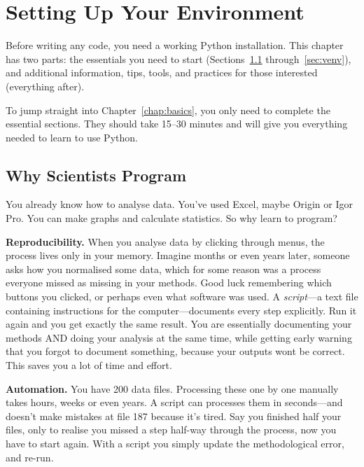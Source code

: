 
\chapter{Setting Up Your Environment}
\label{chap:setup}

Before writing any code, you need a working Python installation. This chapter has two parts: the essentials you need to start (Sections~\ref{sec:why-program} through~\ref{sec:venv}), and additional information, tips, tools, and practices for those interested (everything after).

To jump straight into Chapter~\ref{chap:basics}, you only need to complete the essential sections. They should take 15--30 minutes and will give you everything needed to learn to use Python.

\section{Why Scientists Program}
\label{sec:why-program}

You already know how to analyse data. You've used Excel, maybe Origin or Igor Pro. You can make graphs and calculate statistics. So why learn to program?

\textbf{Reproducibility.} When you analyse data by clicking through menus, the process lives only in your memory. Imagine months or even years later, someone asks how you normalised some data, which for some reason was a process everyone missed as missing in your methods. Good luck remembering which buttons you clicked, or perhaps even what software was used. A \emph{script}---a text file containing instructions for the computer---documents every step explicitly. Run it again and you get exactly the same result. You are essentially documenting your methods AND doing your analysis at the same time, while getting early warning that you forgot to document something, because your outputs wont be correct. This saves you a lot of time and effort.

\textbf{Automation.} You have 200 data files. Processing these one by one manually takes hours, weeks or even years. A script can processes them in seconds---and doesn't make mistakes at file 187 because it's tired. Say you finished half your files, only to realise you missed a step half-way through the process, now you have to start again. With a script you simply update the methodological error, and re-run.

